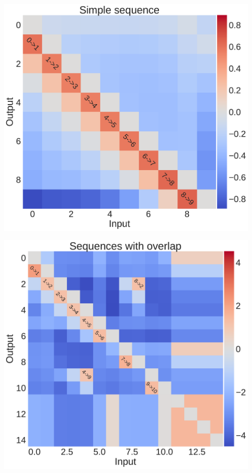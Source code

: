 \documentclass[portrait,final]{baposter}
\begin{document}
\begin{poster}
{	\begin{center}
    \includegraphics[scale=0.15]{matrix_norma.pdf}
  	\end{center}
  
  
  \begin{center}
    \includegraphics[scale=0.15]{matrix_overlap.pdf}
  	\end{center}
  	
}
\end{poster}
\end{document}
